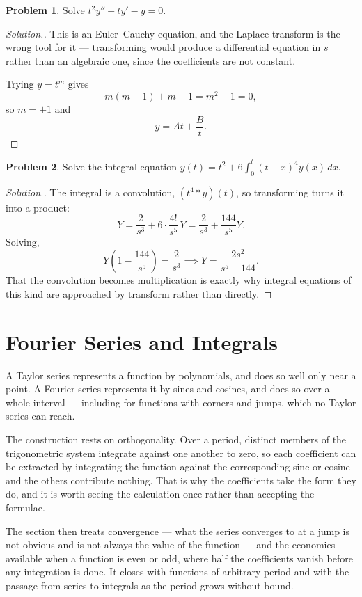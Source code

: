 \documentclass[11pt,a4paper]{article}
\theoremstyle{definition}
\newtheorem{problemx}{Problem}[subsection]
\newenvironment{problem}{\begin{problemx}}{\end{problemx}}
\newenvironment{solution}
  {\renewcommand{\qedsymbol}{}\begin{proof}[\textit{Solution}.]}
  {\end{proof}}
\begin{document}
\begin{problem}
Solve $t^2y''+ty'-y = 0$.
\end{problem}
\begin{solution}
This is an Euler--Cauchy equation, and the Laplace transform is the wrong tool
for it --- transforming would produce a differential equation in $s$ rather than
an algebraic one, since the coefficients are not constant.

Trying $y = t^m$ gives
\[m(m-1) + m - 1 = m^2-1 = 0 ,\]
so $m = \pm 1$ and
\[y = At + \frac{B}{t}.\]
\end{solution}

\begin{problem}
Solve the integral equation
$\displaystyle{y(t) = t^2 + 6\int_0^t(t-x)^4y(x)\,dx}$.
\end{problem}
\begin{solution}
The integral is a convolution, $(t^4 * y)(t)$, so transforming turns it
into a product:
\[Y = \frac{2}{s^3} + 6\cdot\frac{4!}{s^5}\,Y
= \frac{2}{s^3} + \frac{144}{s^5}Y .\]
Solving,
\[Y\left(1-\frac{144}{s^5}\right) = \frac{2}{s^3}
\implies Y = \frac{2s^2}{s^5-144}.\]
That the convolution becomes multiplication is exactly why integral equations of
this kind are approached by transform rather than directly.
\end{solution}



\pagebreak
{\color[wave]{485}\section{Fourier Series and Integrals}}

A Taylor series represents a function by polynomials, and does so well only near
a point. A Fourier series represents it by sines and cosines, and does so over a
whole interval --- including for functions with corners and jumps, which no
Taylor series can reach.

The construction rests on orthogonality. Over a period, distinct members of the
trigonometric system integrate against one another to zero, so each coefficient
can be extracted by integrating the function against the corresponding sine or
cosine and the others contribute nothing. That is why the coefficients take the
form they do, and it is worth seeing the calculation once rather than accepting
the formulae.

The section then treats convergence --- what the series converges to at a jump is
not obvious and is not always the value of the function --- and the economies
available when a function is even or odd, where half the coefficients vanish
before any integration is done. It closes with functions of arbitrary period and
with the passage from series to integrals as the period grows without bound.
\end{document}
